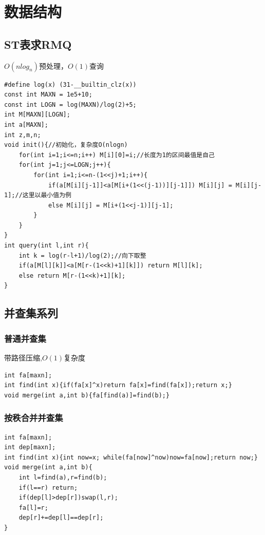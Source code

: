 \documentclass[a4]{ctexart}
\begin{document}
\section{数据结构}
\subsection{ST表求RMQ}
$O(nlog_n)$预处理，$O(1)$查询
\begin{lstlisting}
#define log(x) (31-__builtin_clz(x))
const int MAXN = 1e5+10;
const int LOGN = log(MAXN)/log(2)+5;
int M[MAXN][LOGN]; 
int a[MAXN];
int z,m,n;
void init(){//初始化，复杂度O(nlogn) 
	for(int i=1;i<=n;i++) M[i][0]=i;//长度为1的区间最值是自己 
	for(int j=1;j<=LOGN;j++){
		for(int i=1;i<=n-(1<<j)+1;i++){
			if(a[M[i][j-1]]<a[M[i+(1<<(j-1))][j-1]]) M[i][j] = M[i][j-1];//这里以最小值为例 
			else M[i][j] = M[i+(1<<j-1)][j-1];
		}
	} 
}
int query(int l,int r){
	int k = log(r-l+1)/log(2);//向下取整
	if(a[M[l][k]]<a[M[r-(1<<k)+1][k]]) return M[l][k];
	else return M[r-(1<<k)+1][k];
}
\end{lstlisting}

\subsection{并查集系列}
\subsubsection{普通并查集}
带路径压缩,$O(1)$复杂度
\begin{lstlisting}
int fa[maxn];
int find(int x){if(fa[x]^x)return fa[x]=find(fa[x]);return x;}
void merge(int a,int b){fa[find(a)]=find(b);}	
\end{lstlisting}
\subsubsection{按秩合并并查集}
\begin{lstlisting}
int fa[maxn];
int dep[maxn];
int find(int x){int now=x; while(fa[now]^now)now=fa[now];return now;}
void merge(int a,int b){
    int l=find(a),r=find(b);
    if(l==r) return;
    if(dep[l]>dep[r])swap(l,r);
    fa[l]=r;
    dep[r]+=dep[l]==dep[r];
}
\end{lstlisting}
\end{document}
